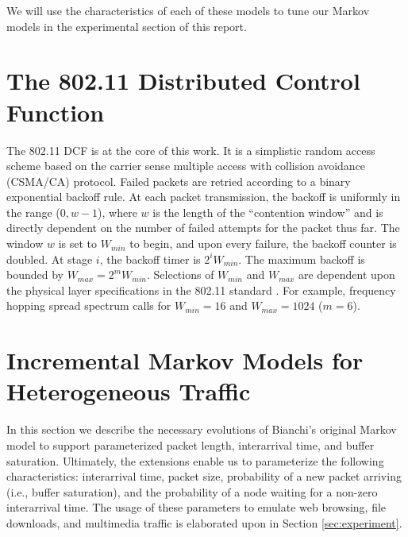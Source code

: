 \documentclass[conference]{IEEEtran}
\begin{document}
We will use the characteristics of each of these models to tune our Markov models in the experimental section of this report. 

\section{The 802.11 Distributed Control Function}
The 802.11 DCF \cite{ieee1997wireless} is at the core of this work. It is a simplistic random access scheme based on the carrier sense multiple access with collision avoidance (CSMA/CA) protocol. Failed packets are retried according to a binary exponential backoff rule. At each packet transmission, the backoff is uniformly in the range ($0, w-1$), where $w$ is the length of the ``contention window'' and is directly dependent on the number of failed attempts for the packet thus far. The window $w$ is set to $W_{min}$ to begin, and upon every failure, the backoff counter is doubled. At stage $i$, the backoff timer is $2^iW_{min}$. The maximum backoff is bounded by $W_{max} = 2^mW_{min}$. Selections of $W_{min}$ and $W_{max}$ are dependent upon the physical layer specifications in the 802.11 standard \cite{ieee1997wireless,dcf}. For example, frequency hopping spread spectrum calls for $W_{min} = 16$ and $W_{max} = 1024$ ($m = 6$). 

\section{Incremental Markov Models for Heterogeneous Traffic}
In this section we describe the necessary evolutions of Bianchi's original Markov model to support parameterized packet length, interarrival time, and buffer saturation. Ultimately, the extensions enable us to parameterize the following characteristics: interarrival time, packet size, probability of a new packet arriving (i.e., buffer saturation), and the probability of a node waiting for a non-zero interarrival time. The usage of these parameters to emulate web browsing, file downloads, and multimedia traffic is elaborated upon in Section \ref{sec:experiment}.
\end{document}

